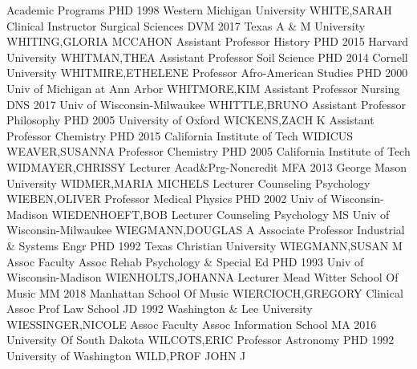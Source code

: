\documentclass[
]{article}
\begin{document}
\textbar Academic Programs \textbar PHD 1998 Western Michigan University
\textbar{}  \textbar WHITE,SARAH \textbar Clinical
Instructor \textbar Surgical Sciences \textbar DVM 2017 Texas A \& M
University \textbar{}  \textbar WHITING,GLORIA MCCAHON
\textbar Assistant Professor \textbar History \textbar PHD 2015 Harvard
University \textbar{}  \textbar WHITMAN,THEA
\textbar Assistant Professor \textbar Soil Science \textbar PHD 2014
Cornell University \textbar{}  \textbar WHITMIRE,ETHELENE
\textbar Professor \textbar Afro-American Studies \textbar PHD 2000 Univ
of Michigan at Ann Arbor \textbar{}  \textbar WHITMORE,KIM
\textbar Assistant Professor \textbar Nursing \textbar DNS 2017 Univ of
Wisconsin-Milwaukee \textbar{}  \textbar WHITTLE,BRUNO
\textbar Assistant Professor \textbar Philosophy \textbar PHD 2005
University of Oxford \textbar{}  \textbar WICKENS,ZACH K
\textbar Assistant Professor \textbar Chemistry \textbar PHD 2015
California Institute of Tech \textbar{}  \textbar WIDICUS
WEAVER,SUSANNA \textbar Professor \textbar Chemistry \textbar PHD 2005
California Institute of Tech \textbar{} 
\textbar WIDMAYER,CHRISSY \textbar Lecturer \textbar Acad\&Prg-Noncredit
\textbar MFA 2013 George Mason University \textbar{} 
\textbar WIDMER,MARIA MICHELS \textbar Lecturer \textbar Counseling
Psychology \textbar WIEBEN,OLIVER \textbar{} 
\textbar Professor \textbar Medical Physics \textbar PHD 2002 Univ of
Wisconsin-Madison \textbar WIEDENHOEFT,BOB \textbar{} 
\textbar Lecturer \textbar Counseling Psychology \textbar MS Univ of
Wisconsin-Milwaukee \textbar WIEGMANN,DOUGLAS A \textbar{} 
\textbar Associate Professor \textbar Industrial \& Systems Engr
\textbar PHD 1992 Texas Christian University \textbar WIEGMANN,SUSAN M
\textbar{}  \textbar Assoc Faculty Assoc \textbar Rehab
Psychology \& Special Ed \textbar PHD 1993 Univ of Wisconsin-Madison
\textbar WIENHOLTS,JOHANNA \textbar{}  \textbar Lecturer
\textbar Mead Witter School Of Music \textbar MM 2018 Manhattan School
Of Music \textbar WIERCIOCH,GREGORY \textbar{} 
\textbar Clinical Assoc Prof \textbar Law School \textbar JD 1992
Washington \& Lee University \textbar WIESSINGER,NICOLE \textbar{}
 \textbar Assoc Faculty Assoc \textbar Information School
\textbar MA 2016 University Of South Dakota \textbar WILCOTS,ERIC
\textbar{}  \textbar Professor \textbar Astronomy
\textbar PHD 1992 University of Washington \textbar WILD,PROF JOHN J
\end{document}
